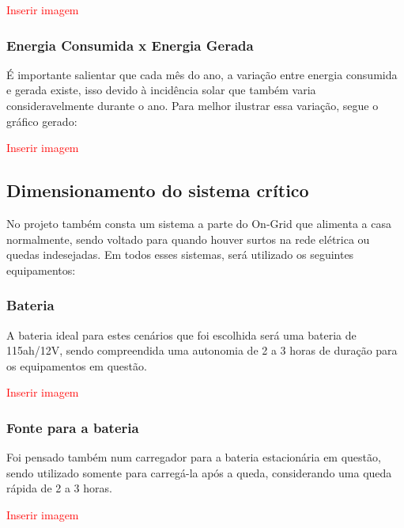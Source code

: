 \textcolor{red}{Inserir imagem}

\subsubsection{Energia Consumida x Energia Gerada}
\par É importante salientar que cada mês do ano, a variação entre energia consumida e gerada existe, isso devido à incidência solar que também varia consideravelmente durante o ano. Para melhor ilustrar essa variação, segue o gráfico gerado:

\textcolor{red}{Inserir imagem}

\subsection{Dimensionamento do sistema crítico}
\par No projeto também consta um sistema a parte do On-Grid que alimenta a casa normalmente, sendo voltado para quando houver surtos na rede elétrica ou quedas indesejadas. Em todos esses sistemas, será utilizado os seguintes equipamentos:

\subsubsection{Bateria}
\par A bateria ideal para estes cenários que foi escolhida será uma bateria de 115ah/12V, sendo compreendida uma autonomia de 2 a 3 horas de duração para os equipamentos em questão.

\textcolor{red}{Inserir imagem}

\subsubsection{Fonte para a bateria}
\par Foi pensado também num carregador para a bateria estacionária em questão, sendo utilizado somente para carregá-la após a queda, considerando uma queda rápida de 2 a 3 horas.

\textcolor{red}{Inserir imagem}

